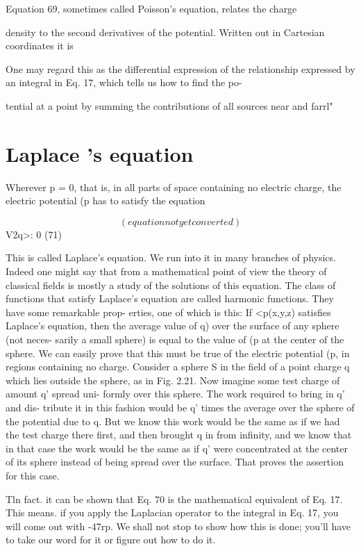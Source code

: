 Equation 69, sometimes called Poisson's equation, relates the charge

density to the second derivatives of the potential. Written out in
Cartesian coordinates it is

One may regard this as the differential expression of the relationship
expressed by an integral in Eq. 17, which tells us how to find the po-

tential at a point by summing the contributions of all sources near
and farrl"

\section{Laplace 's equation}

Wherever p = 0, that is, in all parts of space containing no electric
charge, the electric potential (p has to satisfy the equation

\begin{equation}
(equation not yet converted)
\end{equation}
V2q>: 0 (71)

This is called Laplace's equation. We run into it in many branches
of physics. Indeed one might say that from a mathematical point of
view the theory of classical fields is mostly a study of the solutions of
this equation. The class of functions that satisfy Laplace's equation
are called harmonic functions. They have some remarkable prop-
erties, one of which is this: If <p(x,y,z) satisfies Laplace's equation,
then the average value of q) over the surface of any sphere (not neces-
sarily a small sphere) is equal to the value of (p at the center of the
sphere. We can easily prove that this must be true of the electric
potential (p, in regions containing no charge. Consider a sphere S
in the field of a point charge q which lies outside the sphere, as in
Fig. 2.21. Now imagine some test charge of amount q' spread uni-
formly over this sphere. The work required to bring in q' and dis-
tribute it in this fashion would be q' times the average over the sphere
of the potential due to q. But we know this work would be the same
as if we had the test charge there first, and then brought q in from
infinity, and we know that in that case the work would be the same as
if q' were concentrated at the center of its sphere instead of being
spread over the surface. That proves the assertion for this case.

Tln fact. it can be shown that Eq. 70 is the mathematical equivalent of Eq. 17. This
means. if you apply the Laplacian operator to the integral in Eq. 17, you will come
out with -47rp. We shall not stop to show how this is done; you'll have to take our
word for it or figure out how to do it.

